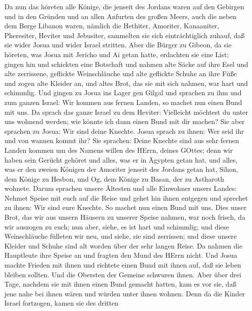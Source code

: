  Da nun das höreten alle Könige, die jenseit des Jordans
waren auf den Gebirgen und in den Gründen und an allen Anfurten des
großen Meers, auch die neben dem Berge Libanon waren, nämlich die
Hethiter, Amoriter, Kanaaniter, Pheresiter, Heviter und Jebusiter,
 sammelten sie sich einträchtiglich zuhauf, daß sie wider
Josua und wider Israel stritten.  Aber die Bürger zu Gibeon,
da sie höreten, was Josua mit Jericho und Ai getan hatte, erdachten sie
eine List;  gingen hin und schickten eine Botschaft und
nahmen alte Säcke auf ihre Esel  und alte zerrissene,
geflickte Weinschläuche und alte geflickte Schuhe an ihre Füße und zogen
alte Kleider an, und altes Brot, das sie mit sich nahmen, war hart und
schimmlig.  Und gingen zu Josua ins Lager gen Gilgal und
sprachen zu ihm und zum ganzen Israel: Wir kommen aus fernen Landen, so
machet nun einen Bund mit uns.  Da sprach das ganze Israel
zu dem Heviter: Vielleicht möchtest du unter uns wohnend werden; wie
könnte ich dann einen Bund mit dir machen?  Sie aber
sprachen zu Josua: Wir sind deine Knechte. Josua sprach zu ihnen: Wer
seid ihr und von wannen kommt ihr?  Sie sprachen: Deine
Knechte sind aus sehr fernen Landen kommen um des Namens willen des
HErrn, deines GOttes; denn wir haben sein Gerücht gehöret und alles, was
er in Ägypten getan hat,  und alles, was er den zweien
Königen der Amoriter jenseit des Jordans getan hat, Sihon, dem Könige zu
Hesbon, und Og, dem Könige zu Basan, der zu Astharoth wohnete.
 Darum sprachen unsere Ältesten und alle Einwohner unsers
Landes: Nehmet Speise mit euch auf die Reise und gehet hin ihnen
entgegen und sprechet zu ihnen: Wir sind eure Knechte. So machet nun
einen Bund mit uns.  Dies unser Brot, das wir aus unsern
Häusern zu unserer Speise nahmen, war noch frisch, da wir auszogen zu
euch; nun aber, siehe, es ist hart und schimmlig;  und
diese Weinschläuche fülleten wir neu, und siehe, sie sind zerrissen; und
diese unsere Kleider und Schuhe sind alt worden über der sehr langen
Reise.  Da nahmen die Hauptleute ihre Speise an und fragten
den Mund des HErrn nicht.  Und Josua machte Frieden mit
ihnen und richtete einen Bund mit ihnen auf, daß sie leben bleiben
sollten. Und die Obersten der Gemeine schwuren ihnen.  Aber
über drei Tage, nachdem sie mit ihnen einen Bund gemacht hatten, kam es
vor sie, daß jene nahe bei ihnen wären und würden unter ihnen wohnen.
 Denn da die Kinder Israel fortzogen, kamen sie des dritten
